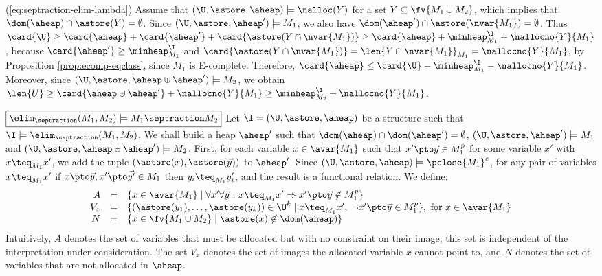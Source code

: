 {  (\ref{eq:septraction-elim-lambda}) Assume that $(\U,\astore,\aheap)
  \models \nalloc(Y)$ for a set $Y \subseteq \fv{M_1 \cup M_2}$, which
  implies that $\dom(\aheap) \cap \astore(Y) = \emptyset$. Since
  $(\U,\astore,\aheap') \models M_1$, we also have $\dom(\aheap') \cap
  \astore(\nvar{M_1}) = \emptyset$. Thus $\card{\U} \geq \card{\aheap}
  + \card{\aheap'} + \card{\astore(Y \cap \nvar{M_1})} \geq
  \card{\aheap} + \minheap^\I_{M_1} + \nallocno{Y}{M_1}$, because
  $\card{\aheap'} \geq \minheap^\I_{M_1}$ and $\card{\astore(Y \cap
    \nvar{M_1})} = \len{Y \cap \nvar{M_1}}_{M_1} = \nallocno{Y}{M_1}$,
  by Proposition \ref{prop:ecomp-eqclass}, since $M_1$ is
  E-complete. Therefore, $\card{\aheap} \leq \card{\U} -
  \minheap^\I_{M_1} - \nallocno{Y}{M_1}$.  Moreover, since
  $(\U,\astore,\aheap\uplus\aheap') \models M_2$, we obtain $\len{U}
  \geq \card{\aheap \uplus \aheap'} + \nallocno{Y}{M_1} \geq
  \minheap^\I_{M_2} + \nallocno{Y}{M_1}$.

  \noindent
  $\boxed{\elim_{\septraction}(M_1,M_2) \models M_1 \septraction M_2}$
  Let $\I = (\U,\astore,\aheap)$ be a structure such that $\I \models
  \elim_{\septraction}(M_1,M_2)$. We shall build a heap $\aheap'$ such
  that $\dom(\aheap) \cap \dom(\aheap') = \emptyset$,
  $(\U,\astore,\aheap') \models M_1$ and
  $(\U,\astore,\aheap\uplus\aheap') \models M_2$. First, for each
  variable $x \in \avar{M_1}$ such that $x' \pto \vec{y} \in M_1^p$
  for some variable $x'$ with $x \teq_{M_1} x'$, we add the tuple
  $(\astore(x),\astore(\vec{y}))$ to $\aheap'$. Since
  $(\U,\astore,\aheap) \models \pclose{M_1}^e$, for any pair of
  variables $x \teq_{M_1} x'$ if $x \pto \vec{y}, x' \pto \vec{y'} \in
  M_1$ then $y_i \teq_{M_1} y'_i$, and the result is a functional
  relation. We define:
  \[\begin{array}{rcl}
  A & = & \{x \in \avar{M_1} \mid \forall x' \forall \vec{y} ~.~ 
  x \teq_{M_1} x' \Rightarrow x' \pto \vec{y} \not\in M_1^p\} \\
  V_x & = & \{(\astore(y_1),\ldots,\astore(y_k)) \in \U^k \mid 
  x \teq_{M_1} x',~ \neg x' \pto \vec{y} \in M_1^p\}, \text{ for $x \in \avar{M_1}$} \\
  N & = & \{x \in \fv{M_1 \cup M_2} \mid \astore(x) \not\in \dom(\aheap)\}
  \end{array}\]
  Intuitively, $A$ denotes the set of variables that must be allocated
  but with no constraint on their image; this set is independent of
  the interpretation under consideration. The set $V_x$ denotes the
  set of images the allocated variable $x$ cannot point to, and $N$
  denotes the set of variables that are not allocated in $\aheap$.

}
